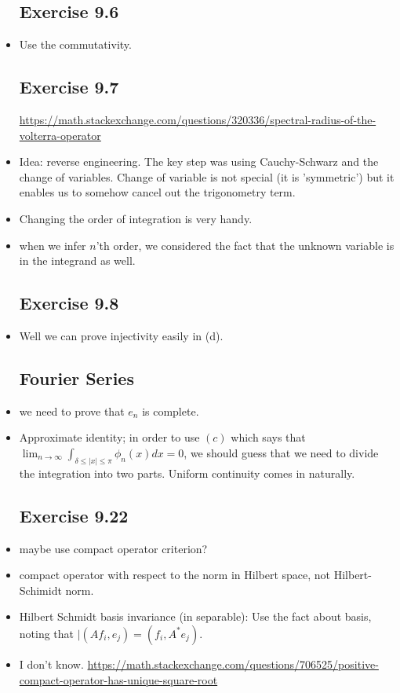 \documentclass{article}
\theoremstyle{remark}
\begin{document}
\begin{itemize}
\subsection*{Exercise 9.6}
\item Use the commutativity.

\subsection*{Exercise 9.7}
\url{https://math.stackexchange.com/questions/320336/spectral-radius-of-the-volterra-operator}
\item Idea: reverse engineering. The key step was using Cauchy-Schwarz and the change of variables. Change of variable is not special (it is 'symmetric') but it enables us to somehow cancel out the trigonometry term. 

\item Changing the order of integration is very handy.

\item when we infer $n$'th order, we considered the fact that the unknown variable is in the integrand as well.











\subsection*{Exercise 9.8}
\item Well we can prove injectivity easily in (d). 





\subsection*{Fourier Series}
\item we need to prove that $e_n$ is complete.
\item Approximate identity; in order to use $(c)$ which says that $\lim_{n\to \infty}\int_{\delta\leq\mid x\mid\leq \pi}\phi_n (x)dx=0$, we should guess that we need to divide the integration into two parts. Uniform continuity comes in naturally. 

\subsection*{Exercise 9.22}
\item maybe use compact operator criterion?
\item compact operator with respect to the norm in Hilbert space, not Hilbert-Schimidt norm.
\item Hilbert Schmidt basis invariance (in separable): Use the fact about basis, noting that $\mid (Af_i,e_j)=(f_i,A^*e_j)$.
\item I don't know.
\url{https://math.stackexchange.com/questions/706525/positive-compact-operator-has-unique-square-root}


\end{itemize}
\end{document}
